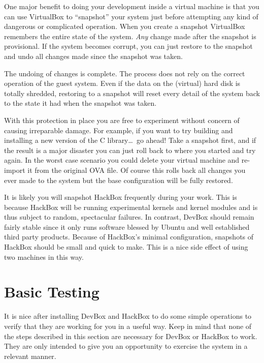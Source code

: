 \documentclass[twocolumn]{article}
\begin{document}
One major benefit to doing your development inside a virtual machine is that you can use
VirtualBox to ``snapshot'' your system just before attempting any kind of dangerous or
complicated operation. When you create a snapshot VirtualBox remembers the entire state of the
system. \emph{Any} change made after the snapshot is provisional. If the system becomes corrupt,
you can just restore to the snapshot and undo all changes made since the snapshot was taken.

The undoing of changes is complete. The process does not rely on the correct operation of the
guest system. Even if the data on the (virtual) hard disk is totally shredded, restoring to a
snapshot will reset every detail of the system back to the state it had when the snapshot was
taken.

With this protection in place you are free to experiment without concern of causing irreparable
damage. For example, if you want to try building and installing a new version of the C
library\ldots\ go ahead! Take a snapshot first, and if the result is a major disaster you can
just roll back to where you started and try again. In the worst case scenario you could delete
your virtual machine and re-import it from the original OVA file. Of course this rolls back all
changes you ever made to the system but the base configuration will be fully restored.

It is likely you will snapshot HackBox frequently during your work. This is because HackBox will
be running experimental kernels and kernel modules and is thus subject to random, spectacular
failures. In contrast, DevBox should remain fairly stable since it only runs software blessed by
Ubuntu and well established third party products. Because of HackBox's minimal configuration,
snapshots of HackBox should be small and quick to make. This is a nice side effect of using two
machines in this way.

\section{Basic Testing}

It is nice after installing DevBox and HackBox to do some simple operations to verify that they
are working for you in a useful way. Keep in mind that none of the steps described in this
section are necessary for DevBox or HackBox to work. They are only intended to give you an
opportunity to exercise the system in a relevant manner.
\end{document}
